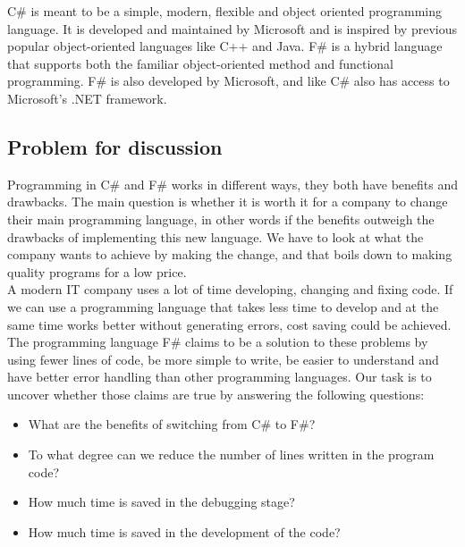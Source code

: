 \documentclass[12pt, a4paper]{article}
\begin{document}
C\# is meant to be a simple, modern, flexible and object oriented programming language. It is developed and maintained by Microsoft and is inspired by previous popular object-oriented languages like C++ and Java. F\# is a hybrid language that supports both the familiar object-oriented method and functional programming. F\# is also developed by Microsoft, and like C\# also has access to Microsoft’s .NET framework. 

\newpage
\subsection{Problem for discussion}
Programming in C\# and F\# works in different ways, they both have benefits and drawbacks. The main question is whether it is worth it for a company to change their main programming language, in other words if the benefits outweigh the drawbacks of implementing this new language. We have to look at what the company wants to achieve by making the change, and that boils down to making quality programs for a low price. \\

A modern IT company uses a lot of time developing, changing and fixing code. If we can use a programming language that takes less time to develop and at the same time works better without generating errors, cost saving could be achieved.\\

The programming language F\# claims to be a solution to these problems by using fewer lines of code, be more simple to write, be easier to understand and have better error handling than other programming languages. Our task is to uncover whether those claims are true by answering the following questions:

\begin{itemize}
\item What are the benefits of switching from C\# to F\#?
\item To what degree can we reduce the number of lines written in the program code?
\item How much time is saved in the debugging stage?
\item How much time is saved in the development of the code?
\end{itemize}
\end{document}
